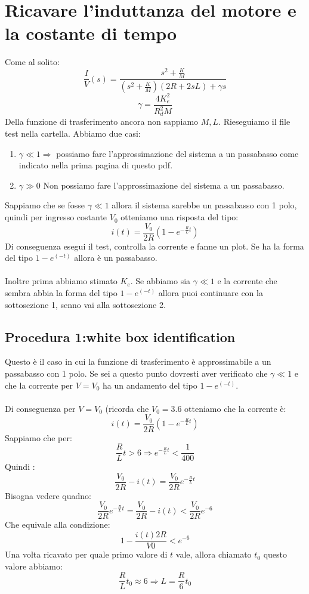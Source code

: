 \documentclass[10pt,a4paper]{article}
\begin{document}
\section{Ricavare l'induttanza del motore e la costante di tempo}
Come al solito:
$$\frac{I}{V}(s) = \frac{s^2+\frac{K}{M}}{(s^2+\frac{K}{M})(2R+2sL)+\gamma s}$$
$$\gamma = \frac{4K_e^2}{R_d^2M}$$
Della funzione di trasferimento ancora non sappiamo $M,L$. Rieseguiamo il file test nella cartella. Abbiamo due casi:
\begin{enumerate}
\item $\gamma \ll 1 \Rightarrow$ possiamo fare l'approssimazione del sistema a un passabasso come indicato nella prima pagina di questo pdf.
\item $\gamma \gg 0$ Non possiamo fare l'approssimazione del sistema a un passabasso.
\end{enumerate}
Sappiamo che se fosse $\gamma \ll 1$ allora il sistema sarebbe un passabasso con 1 polo, quindi per ingresso costante $V_0$ otteniamo una risposta del tipo:
$$i(t) = \frac{V_0}{2R}(1-e^{-\frac{R}{L}t})$$
Di conseguenza esegui il test, controlla la corrente e fanne un plot. Se ha la forma del tipo $1-e^(-t)$ allora è un passabasso. \\ \\

Inoltre prima abbiamo stimato $K_e$. Se abbiamo sia $\gamma \ll 1 $ e la corrente che sembra abbia la forma del tipo $1-e^(-t)$ allora puoi continuare con la sottosezione 1, senno vai alla sottosezione 2.
\subsection{Procedura 1:white box identification}
Questo è il caso in cui la funzione di trasferimento è approssimabile a un passabasso con 1 polo. Se sei a questo punto dovresti aver verificato che $\gamma \ll 1$ e che la corrente per $V=V_0$ ha un andamento del tipo $1-e^(-t)$. \\  \\
Di conseguenza per $V=V_0$ (ricorda che $V_0=3.6$ otteniamo che la corrente è:
$$i(t) = \frac{V_0}{2R}(1-e^{-\frac{R}{L}t})$$
Sappiamo che per:
$$\frac{R}{L}t > 6 \Rightarrow e^{-\frac{R}{L}t} < \frac{1}{400}$$
Quindi :
$$\frac{V_0}{2R} - i(t) = \frac{V_0}{2R}e^{-\frac{R}{L}t}$$
Bisogna vedere quadno:
$$\frac{V_0}{2R}e^{-\frac{R}{L}t}= \frac{V_0}{2R} - i(t) < \frac{V_0}{2R}e^{-6}$$
Che equivale alla condizione:
$$1- \frac{i(t)2R}{V0} < e^{-6}$$
Una volta ricavato per quale primo valore di $t$ vale, allora chiamato $t_0$ questo valore abbiamo:
$$\frac{R}{L}t_0 \approx 6 \Rightarrow L = \frac{R}{6}t_0$$\\ \\
\end{document}
